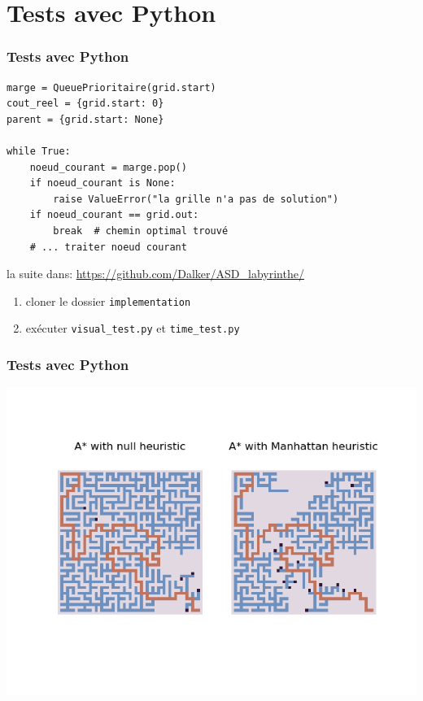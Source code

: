 \documentclass[]{beamer}
\begin{document}
\section{Tests avec Python}
\begin{frame}[fragile]
  \frametitle{Tests avec Python}
  \begin{lstlisting}
marge = QueuePrioritaire(grid.start)
cout_reel = {grid.start: 0}
parent = {grid.start: None}

while True:
    noeud_courant = marge.pop()
    if noeud_courant is None:
        raise ValueError("la grille n'a pas de solution")
    if noeud_courant == grid.out:
        break  # chemin optimal trouvé
    # ... traiter noeud courant
\end{lstlisting}
la suite dans: %
\href{https://github.com/Dalker/ASD\_labyrinthe/tree/main/implementation}{https://github.com/Dalker/ASD\_labyrinthe/}
\begin{enumerate}
\item cloner le dossier \texttt{implementation}
\item exécuter \texttt{visual\_test.py} et \texttt{time\_test.py}
\end{enumerate}
\end{frame}
\begin{frame}
  \frametitle{Tests avec Python}
  \includegraphics[width=.9\linewidth]{manhattan_vs_null.png}
\end{frame}
\end{document}
